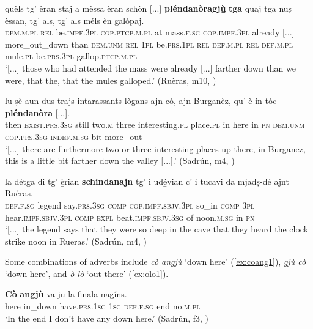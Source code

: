 \ea
\label{ex:plendanoragju}
\gll  [...] quèls tg’ èran staj a mèssa èran schòn [...] \textbf{pléndanòragjù̱} \textbf{tga} quaj tga nuṣ èssan, tg’ als, tg’ als méls èn galòpaj.\\
{} \textsc{dem.m.pl} \textsc{rel} be.\textsc{impf.3pl} \textsc{cop.ptcp.m.pl} at mass.\textsc{f.sg} \textsc{cop.impf.3pl} already [...] more\_out\_down than \textsc{dem.unm} \textsc{rel} \textsc{1pl} be.\textsc{prs.1pl} \textsc{rel} \textsc{def.m.pl} \textsc{rel} \textsc{def.m.pl} mule.\textsc{pl} be.\textsc{prs.3pl} gallop.\textsc{ptcp.m.pl}\\
\glt `[...] those who had attended the mass were already [...] farther down than we were, that the, that the mules galloped.' (Ruèras, m10, )
\z

\ea
\label{ex:plendanora}
\gll [...] lu ṣè aun dus trajs intarassants lògans ajn cò, ajn Burganèz, qu' è in tòc \textbf{pléndanòra} [...].\\
{}  then \textsc{exist.prs.3sg} still two.\textsc{m} three interesting.\textsc{pl} place.\textsc{pl} in here in \textsc{pn} \textsc{dem.unm} \textsc{cop.prs.3sg} \textsc{indef.m.sg} bit more\_out \\
\glt `[...] there are furthermore two or three interesting places up there, in Burganez, this is a little bit farther down the valley [...].' (Sadrún, m4, )
\z

\ea
\label{ex:schindanajn}
\gll [...] la détga di tg’ è̱rian \textbf{schindanajn} tg' i udé̱vian c’ i tucavi da mjadṣ-dé ajnt Ruèras.\\
{} \textsc{def.f.sg} legend say.\textsc{prs.3sg}  \textsc{comp} \textsc{cop.impf.sbjv.3pl} so\_in \textsc{comp} \textsc{3pl} hear.\textsc{impf.sbjv.3pl} \textsc{comp} \textsc{expl} beat.\textsc{impf.sbjv.3sg} of noon.\textsc{m.sg} in \textsc{pn}\\
\glt `[...] the legend says that they were so deep in the cave that they heard the clock strike noon in Rueras.' (Sadrún, m4, )
\z

Some combinations of adverbs include \textit{cò angjù} `down here' (\ref{ex:coang1}), \textit{gjù cò} `down here', and \textit{ò lò} `out there' (\ref{ex:olo1}).

\ea
\label{ex:coang1}
\gll  \textbf{Cò} \textbf{angjù̱} va ju la finala nagíns.\\
here in\_down have.\textsc{prs.1sg} \textsc{1sg} \textsc{def.f.sg} end no.\textsc{m.pl}  \\
\glt `In the end I don’t have any down here.' (Sadrún, f3, )
\z

